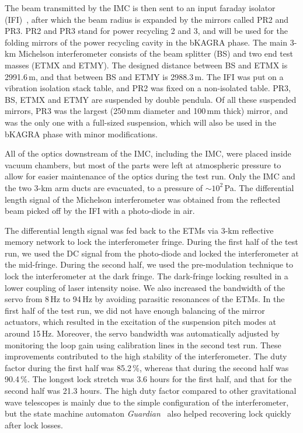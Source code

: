 \documentclass[prd ,twocolumn ,secnumarabic,dvips
,amssymb, amsmath,nobibnotes, aps, prd,superscriptaddress]{revtex4-1}
\begin{document}
{The beam transmitted by the IMC is then sent to an input faraday isolator (IFI)~\cite{IFI}, after which the beam radius is expanded by the mirrors called PR2 and PR3. PR2 and PR3 stand for power recycling 2 and 3, and will be used for the folding mirrors of the power recycling cavity in the bKAGRA phase. The main 3-km Michelson interferometer consists of the beam splitter (BS) and two end test masses (ETMX and ETMY). The designed distance between BS and ETMX is 2991.6\,m, and that between BS and ETMY is 2988.3\,m. The IFI was put on a vibration isolation stack table, and PR2 was fixed on a non-isolated table. PR3, BS, ETMX and ETMY are suspended by double pendula. Of all these suspended mirrors, PR3 was the largest (250\,mm diameter and 100\,mm thick) mirror, and was the only one with a full-sized suspension, which will also be used in the bKAGRA phase with minor modifications.

All of the optics downstream of the IMC, including the IMC, were placed inside vacuum chambers, but most of the parts were left at atmospheric pressure to allow for easier maintenance of the optics during the test run. Only the IMC and the two 3-km arm ducts are evacuated, to a pressure of $\sim10^2$\,Pa. The differential length signal of the Michelson interferometer was obtained from the reflected beam picked off by the IFI with a photo-diode in air.

The differential length signal was fed back to the ETMs via 3-km reflective memory network to lock the interferometer fringe. During the first half of the test run, we used the DC signal from the photo-diode and locked the interferometer at the mid-fringe. During the second half, we used the pre-modulation technique to lock the interferometer at the dark fringe. The dark-fringe locking resulted in a lower coupling of laser intensity noise. We also increased the bandwidth of the servo from 8\,Hz to 94\,Hz by avoiding parasitic resonances of the ETMs. In the first half of the test run, we did not have enough balancing of the mirror actuators, which resulted in the excitation of the suspension pitch modes at around 15\,Hz. 
Moreover, the servo bandwidth was automatically adjusted by monitoring the loop gain using calibration lines in the second test run. These improvements contributed to the high stability of the interferometer. The duty factor during the first half was 85.2\,\%, whereas that during the second half was 90.4\,\%. The longest lock stretch was 3.6 hours for the first half, and that for the second half was 21.3 hours. The high duty factor compared to other gravitational wave telescopes is mainly due to the simple configuration of the interferometer, but the state machine automaton {\it Guardian}~\cite{guardian_iKAGRA} also helped recovering lock quickly after lock losses.

}
\end{document}
